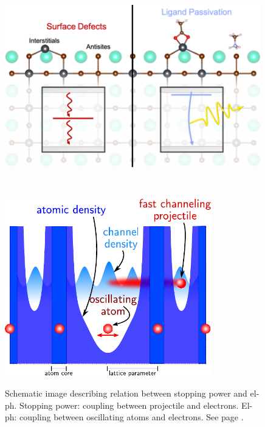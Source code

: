\begin{figure}[h]
	\centering
	\begin{minipage}[b]{.48\textwidth}
		\centering
		\includegraphics[width=0.99\textwidth]{figures/defect_passivation} 
		\caption{%
			Schematic atomic structure of defects at the surface of \(\mathrm{CsPbBr_3}\), which are susceptible to non-radiative recombination when unpassivated (left), but become less detrimental to radiative recombination when passivated (right).
			\label{fig:defect}
		}
	\end{minipage}
	~
	\begin{minipage}[b]{.48\textwidth}
		\centering
		\includegraphics[width=0.8\textwidth]{figures/stopping_eph}    \\
		\caption{%
			Schematic image describing relation between stopping power and el-ph. Stopping power: coupling between projectile and electrons. El-ph: coupling between oscillating atoms and electrons. See page \pageref{page:stopping_eph}. 
			\label{fig:stopping_eph}
		}
	\end{minipage}
\end{figure}

